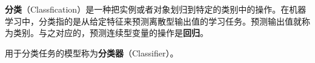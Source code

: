
\textbf{分类}（Classfication）是一种把实例或者对象划归到特定的类别中的操作。在机器学习中，分类指的是从给定特征来预测离散型输出值的学习任务。预测输出值就称为类别。与之对应的，预测连续型变量的操作是\textbf{回归}。

用于分类任务的模型称为\textbf{分类器}（Classifier）。